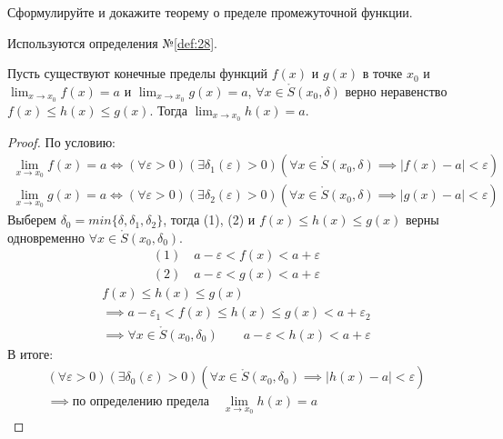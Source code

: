 \begin{question}
    Сформулируйте и докажите теорему о пределе промежуточной функции.
\end{question}
\begin{used}
    Используются определения №\ref{def:28}.
\end{used}
\begin{theorem} 
    Пусть существуют конечные пределы функций $f(x)$ и $g(x)$ в точке  $x_0$ и $\lim_{x \to x_0} f(x) = a$ и $\lim_{x \to x_0} g(x) = a$, $\forall x \in \mathring{S}(x_0, \delta)$ верно неравенство $f(x) \le h(x) \le g(x)$. Тогда $\lim_{x \to x_0} h(x) = a$.
\end{theorem}
\begin{proof}
    По условию: 
    \begin{gather*}
        \lim_{x \to x_0} f(x) = a \iff (\forall \varepsilon > 0)(\exists \delta_1(\varepsilon) > 0)(\forall x \in \mathring{S}(x_0, \delta) \implies |f(x) - a| < \varepsilon) \tag{1} \\
        \lim_{x \to x_0} g(x) = a \iff (\forall \varepsilon > 0)(\exists \delta_2(\varepsilon) > 0)(\forall x \in \mathring{S}(x_0, \delta) \implies |g(x) - a| < \varepsilon) \tag{2}
    \end{gather*}
    Выберем $\delta_0 = min \{\delta, \delta_1, \delta_2\}$, тогда (1), (2) и $f(x) \le h(x) \le g(x)$ верны одновременно $\forall x \in \mathring{S}(x_0, \delta_0)$.
    \begin{align*}
        (1) \quad a - \varepsilon < f(x) < a + \varepsilon \\
        (2) \quad a - \varepsilon < g(x) < a + \varepsilon
    \end{align*}
    \begin{gather*}
        f(x) \le h(x) \le g(x) \\
        \implies a - \varepsilon_1 < f(x) \le h(x) \le g(x) < a + \varepsilon_2 \\
        \implies \forall x \in \mathring{S}(x_0, \delta_0) \qquad a - \varepsilon < h(x) < a + \varepsilon
    \end{gather*}
    В итоге:
    \begin{gather*}
        (\forall \varepsilon > 0)(\exists \delta_0(\varepsilon) > 0)(\forall x \in \mathring{S}(x_0, \delta_0) \implies |h(x) - a| < \varepsilon) \\
        \implies \text{по определению предела} \quad \lim_{x \to x_0} h(x) = a
    \end{gather*}
\end{proof}
\pagebreak



